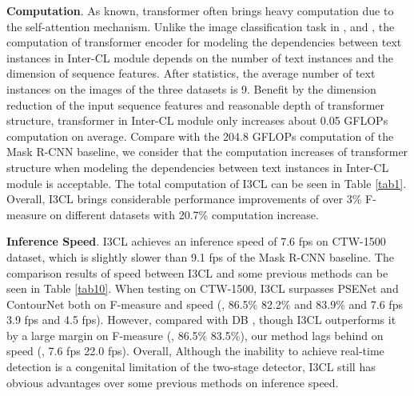 \textbf{Computation}. As known, transformer often brings heavy computation due to the self-attention mechanism. Unlike the image classification task in \citep{xu2021vitae}, \citep{zhang2022vitaev2} and \citep{swin}, the computation of transformer encoder for modeling the dependencies between text instances in Inter-CL module depends on the number of text instances and the dimension of sequence features. After statistics, the average number of text instances on the images of the three datasets is 9. Benefit by the dimension reduction of the input sequence features and reasonable depth of transformer structure, transformer in Inter-CL module only increases about 0.05 GFLOPs computation on average. Compare with the 204.8 GFLOPs computation of the Mask R-CNN baseline, we consider that the computation increases of transformer structure when modeling the dependencies between text instances in Inter-CL module is acceptable. The total computation of I3CL can be seen in Table \ref{tab1}. Overall, I3CL brings considerable performance improvements of over 3\% F-measure on different datasets with 20.7\% computation increase.

\textbf{Inference Speed}. I3CL achieves an inference speed of 7.6 fps on CTW-1500 dataset, which is slightly slower than 9.1 fps of the Mask R-CNN baseline. The comparison results of speed between I3CL and some previous methods can be seen in Table \ref{tab10}. When testing on CTW-1500, I3CL surpasses PSENet \citep{psenet} and ContourNet \citep{contournet} both on F-measure and speed (, 86.5\%  82.2\% and 83.9\% and 7.6 fps  3.9 fps and 4.5 fps). However, compared with DB \citep{db}, though I3CL outperforms it by a large margin on F-measure (, 86.5\%  83.5\%), our method lags behind on speed (, 7.6 fps  22.0 fps). Overall, Although the inability to achieve real-time detection is a congenital limitation of the two-stage detector, I3CL still has obvious advantages over some previous methods on inference speed.

